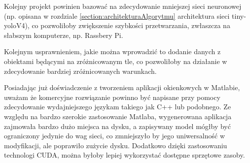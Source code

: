 Kolejny projekt powinien bazować na zdecydowanie mniejszej 
sieci neuronowej (np. opisana w rozdziale \ref{section:architekturaAlgorytmu} architektura sieci tiny-yoloV4), co pozwoliłoby zwiększenie szybkości przetwarzania, zwłaszcza na słabszym komputerze, np. Rassbery Pi.


Kolejnym usprawnieniem, jakie można wprowadzić to dodanie danych z obiektami będącymi na zróżnicowanym tle, co pozwoliłoby na działanie 
w zdecydowanie bardziej zróżnicowanych warunkach.


Posiadając już doświadczenie z tworzeniem aplikacji okienkowych w Matlabie, uważam że komercyjne rozwiązanie powinno być napisane 
przy pomocy zdecydowanie wydajniejszego językam takiego jak C++ lub podobnego. Ze względu na bardzo szerokie zastosowanie Matlaba, wygenerowana aplikacja 
zajmowała bardzo dużo miejsca na dysku, a zapisywany model mógłby być ograniczony jedynie do wag sieci, co zmniejszyło by jego uniwersalność w modyfikacji, 
ale poprawiło zużycie dysku. Dodatkowo dzięki zastosowaniu  technologi CUDA, można byłoby lepiej wykorzystać dostępne sprzętowe zasoby.